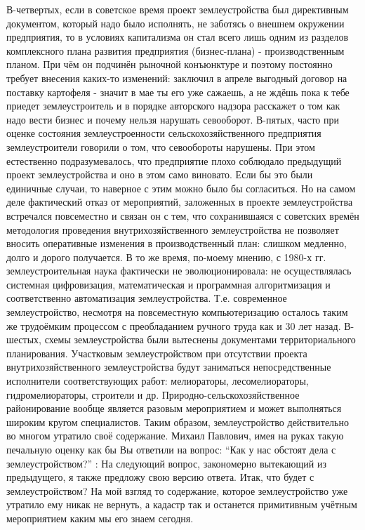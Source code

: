 \begin{drama}
В-четвертых, если в советское время проект землеустройства был директивным документом, который надо было исполнять, не заботясь о внешнем окружении предприятия, то в условиях капитализма он стал всего лишь одним из разделов комплексного плана развития предприятия (бизнес-плана) - производственным планом. При чём он подчинён рыночной конъюнктуре и поэтому постоянно требует внесения каких-то изменений: заключил в апреле выгодный договор на поставку картофеля - значит в мае ты его уже сажаешь, а не ждёшь пока к тебе приедет землеустроитель и в порядке авторского надзора расскажет о том как надо вести бизнес и почему нельзя нарушать севооборот. 
В-пятых, часто при оценке состояния землеустроенности сельскохозяйственного предприятия землеустроители говорили о том, что севообороты нарушены. При этом естественно подразумевалось, что предприятие плохо соблюдало предыдущий проект землеустройства и оно в этом само виновато. Если бы это были единичные случаи, то наверное с этим можно было бы согласиться. Но на самом деле фактический отказ от мероприятий, заложенных в проекте землеустройства встречался повсеместно и связан он с тем, что сохранившаяся с советских времён методология проведения внутрихозяйственного землеустройства не позволяет вносить оперативные изменения в производственный план: слишком медленно, долго и дорого получается.  В то же время, по-моему мнению, с 1980-х гг. землеустроительная наука фактически не эволюционировала: не осуществлялась системная цифровизация, математическая и программная алгоритмизация и соответственно автоматизация землеустройства. Т.е. современное землеустройство, несмотря на повсеместную компьютеризацию осталось таким же трудоёмким процессом с преобладанием ручного труда как и 30 лет назад. 
В-шестых, схемы землеустройства были вытеснены документами территориального планирования. Участковым землеустройством при отсутствии проекта внутрихозяйственного землеустройства будут заниматься непосредственные исполнители соответствующих работ: мелиораторы, лесомелиораторы, гидромелиораторы, строители и др. Природно-сельскохозяйственное районирование вообще является разовым мероприятием и может выполняться широким кругом специалистов.  Таким образом, землеустройство действительно во многом утратило своё содержание.
Михаил Павлович, имея на руках такую печальную оценку как бы Вы ответили на вопрос: “Как у нас обстоят дела с землеустройством?”
	\maxspeaks: На следующий вопрос, закономерно вытекающий из предыдущего, я также предложу свою версию ответа. Итак, что будет с землеустройством?
На мой взгляд то содержание, которое землеустройство уже утратило ему никак не вернуть, а кадастр так и останется примитивным учётным мероприятием каким мы его знаем сегодня. 

\end{drama}
